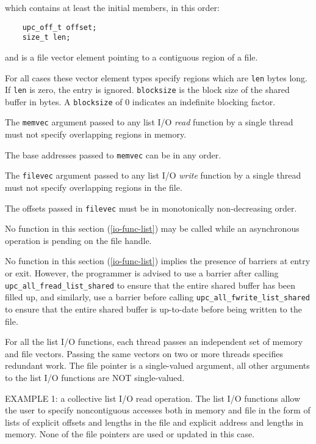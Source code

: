 which contains at least the initial members, in this order: 

\begin{verbatim}
    upc_off_t offset;
    size_t len;
\end{verbatim}

and is a  file vector element pointing to a contiguous region of
a file.

For all cases these vector element types specify regions
which are  {\tt len} bytes long.  If {\tt len} is zero, the entry is ignored.
{\tt blocksize} is the block size of the shared buffer in bytes. A {\tt blocksize} of 0
indicates an indefinite blocking factor.

\np The {\tt memvec} argument passed to any list I/O \textit{read} function by a
single thread must not specify overlapping regions in memory.

\np The base addresses passed to {\tt memvec} can be in any order.

\np The {\tt filevec} argument passed to any list I/O \textit{write} function by a
single thread must not specify overlapping regions in the file.

\np The offsets passed in {\tt filevec} must be in monotonically non-decreasing
order.

\np No function in this section (\ref{io-func-list}) may be called while an asynchronous
operation is pending on the file handle.

\np No function in this section (\ref{io-func-list}) implies the presence of barriers at
entry or exit. However, the programmer is advised to use a barrier after
calling {\tt upc\_all\_fread\_list\_shared} to ensure that the entire shared buffer
has been filled up, and similarly, use a barrier before calling
{\tt upc\_all\_fwrite\_list\_shared} to ensure that the entire shared buffer is
up-to-date before being written to the file.

\np For all the list I/O functions, each thread passes an
independent set of memory and file vectors. Passing the same vectors on two
or more threads specifies redundant work.  The file pointer is a single-valued
argument, all other arguments to the list I/O functions are NOT single-valued.

\np EXAMPLE 1:  a collective list I/O read operation. 
The list I/O functions allow the user to specify noncontiguous accesses both
in memory and file in the form of lists of explicit offsets and lengths in
the file and explicit address and lengths in memory. None of the file
pointers are used or updated in this case. 

